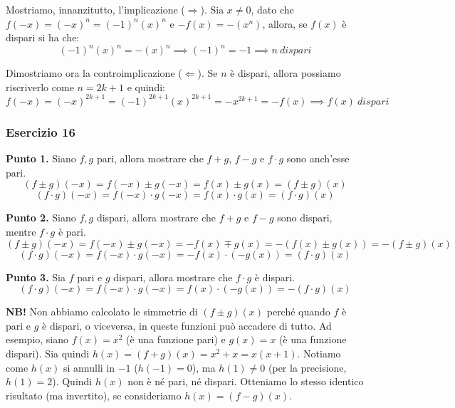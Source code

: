 \documentclass{article}
\begin{document}
\noindent Mostriamo, innanzitutto, l'implicazione ($\Rightarrow$). Sia $x \neq 0$, dato che $f(-x) = (-x)^n = (-1)^n (x)^n$ e $-f(x) = -(x^n)$, allora, se $f(x)$ è dispari si ha che:
\begin{equation*}
    (-1)^n (x)^n = -(x)^n \implies (-1)^n = -1 \implies n \ dispari
\end{equation*}

\noindent Dimostriamo ora la controimplicazione ($\Leftarrow$). Se $n$ è dispari, allora possiamo riscriverlo come $n = 2k + 1$ e quindi:
\begin{equation*}
    f(-x) = (-x)^{2k + 1} = (-1)^{2k + 1} (x)^{2k + 1} = -x^{2k + 1} = -f(x) \implies f(x) \ dispari
\end{equation*}

\subsubsection{Esercizio 16}
\textbf{Punto 1.} Siano $f, g$ pari, allora mostrare che $f + g$, $f - g$ e $f \cdot g$ sono anch'esse pari.
\begin{equation*}
    (f \pm g)(-x) = f(-x) \pm g(-x) = f(x) \pm g(x) = (f \pm g)(x)
\end{equation*}
\begin{equation*}
    (f \cdot g)(-x) = f(-x) \cdot g(-x) = f(x) \cdot g(x) = (f \cdot g)(x)
\end{equation*}

\noindent\textbf{Punto 2.} Siano $f, g$ dispari, allora mostrare che $f + g$ e $f - g$ sono dispari, mentre $f \cdot g$ è pari.
\begin{equation*}
    (f \pm g)(-x) = f(-x) \pm g(-x) = -f(x) \mp g(x) = -(f(x) \pm g(x)) = - (f \pm g)(x)
\end{equation*}
\begin{equation*}
    (f \cdot g)(-x) = f(-x) \cdot g(-x) = -f(x) \cdot (-g(x)) = (f \cdot g)(x)
\end{equation*}

\noindent\textbf{Punto 3.} Sia $f$ pari e $g$ dispari, allora mostrare che $f \cdot g$ è dispari.
\begin{equation*}
    (f \cdot g)(-x) = f(-x) \cdot g(-x) = f(x) \cdot (-g(x)) = - (f \cdot g)(x)
\end{equation*}

\noindent\textbf{NB!} Non abbiamo calcolato le simmetrie di $(f \pm g)(x)$ perché quando $f$ è pari e $g$ è dispari, o viceversa, in queste funzioni può accadere di tutto. Ad esempio, siano $f(x) = x^2$ (è una funzione pari) e $g(x) = x$ (è una funzione dispari). Sia quindi $h(x) = (f + g)(x) = x^2 + x = x(x + 1)$. Notiamo come $h(x)$ si annulli in $-1$ ($h(-1) = 0$), ma $h(1) \neq 0$ (per la precisione, $h(1) = 2$). Quindi $h(x)$ non è né pari, né dispari. Otteniamo lo stesso identico risultato (ma invertito), se consideriamo $h(x) = (f - g)(x)$.\\
\end{document}
